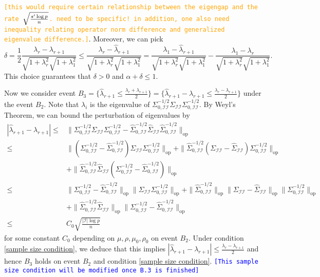 \documentclass[11pt]{article}
\newcommand{\nb}[1]{\textcolor{orange}{\texttt{[#1]}}}
\newcommand{\gsc}[1]{\textcolor{blue}{\texttt{[#1]}}}
\newcommand{\cI}{{\mathcal{I}}}
\newcommand{\0}{{\mathbf{0}}}
\newcommand{\op}{{\mathrm{op}}}
\begin{document}
 \nb{this would require certain relationship between the eigengap and the rate $\sqrt{s'\log p \over n}$. need to be specific! in addition, one also need inequality relating operator norm difference and generalized eigenvalue difference.}. 
Moreover, we can pick 
\begin{equation*}
\delta = \frac{1}{2}\frac{\lambda_r-\lambda_{r+1}}{\sqrt{1+\lambda_r^2}\sqrt{1+\lambda_1^2}}\leq\frac{\lambda_r-\widehat{\lambda}_{r+1}}{\sqrt{1+\lambda_r^2}\sqrt{1+\lambda_1^2}} = \frac{\lambda_1-\widehat{\lambda}_{r+1}}{\sqrt{1+\lambda_{r}^2}\sqrt{1+\lambda_1^2}}-\frac{\lambda_1-\lambda_r}{\sqrt{1+\lambda_r^2}\sqrt{1+\lambda_1^2}} .
\end{equation*}
This choice guarantees that $\delta>0$ and $\alpha+\delta\leq 1$. 
\par Now we consider event $B_3=\{\widehat{\lambda}_{r+1}\leq \frac{\lambda_r+\lambda_{r+1}}{2}\}=\{\widehat{\lambda}_{r+1}-\lambda_{r+1}\leq \frac{\lambda_r-\lambda_{r+1}}{2}\}$ under the event $B_2$. Note that $\lambda_i$ is the eigenvalue of $\Sigma_{0,\cI\cI}^{-1/2}\Sigma_{\cI\cI}\Sigma_{0,\cI\cI}^{-1/2}$. By Weyl's Theorem, we can bound the perturbation of eigenvalues by\begin{align*}
|\widehat{\lambda}_{r+1}-\lambda_{r+1}|
\leq& \|\Sigma_{0,\cI\cI}^{-1/2}\Sigma_{\cI\cI}\Sigma_{0,\cI\cI}^{-1/2}-\widehat{\Sigma}_{0,\cI\cI}^{-1/2}\widehat{\Sigma}_{\cI\cI}\widehat{\Sigma}_{0,\cI\cI}^{-1/2}\|_\op\\
\leq& \|(\Sigma_{0,\cI\cI}^{-1/2}-\widehat{\Sigma}_{0,\cI\cI}^{-1/2})\Sigma_{\cI\cI}\Sigma_{0,\cI\cI}^{-1/2}\|_\op+\|\widehat{\Sigma}_{0,\cI\cI}^{-1/2}(\Sigma_{\cI\cI}-\widehat{\Sigma}_{\cI\cI})\Sigma_{0,\cI\cI}^{-1/2}\|_\op\\
&+\|\widehat{\Sigma}_{0,\cI\cI}^{-1/2}\widehat{\Sigma}_{\cI\cI}(\Sigma_{0,\cI\cI}^{-1/2}-\widehat{\Sigma}_{0,\cI\cI}^{-1/2})\|_\op\\
\leq& \|\Sigma_{0,\cI\cI}^{-1/2}-\widehat{\Sigma}_{0,\cI\cI}^{-1/2}\|_\op\|\Sigma_{\cI\cI}\Sigma_{0,\cI\cI}^{-1/2}\|_\op+\|\widehat{\Sigma}_{0,\cI\cI}^{-1/2}\|_\op\|\Sigma_{\cI\cI}-\widehat{\Sigma}_{\cI\cI}\|_\op\|\Sigma_{0,\cI\cI}^{-1/2}\|_\op\\
&+\|\widehat{\Sigma}_{0,\cI\cI}^{-1/2}\widehat{\Sigma}_{\cI\cI}\|_\op\|\Sigma_{0,\cI\cI}^{-1/2}-\widehat{\Sigma}_{0,\cI\cI}^{-1/2}\|_\op\\
\leq & C_0\sqrt{\frac{|\cI|\log p}{n}}
\end{align*}
for some constant $C_0$ depending on $\mu,\rho,\mu_0,\rho_0$ on event $B_2$. Under condition \eqref{sample size condition}, we deduce that this implies $|\widehat{\lambda}_{r+1}-\lambda_{r+1}|\leq \frac{\lambda_r-\lambda_{r+1}}{2}$ and hence $B_3$ holds on event $B_2$ and condition \eqref{sample size condition}. \gsc{This sample size condition will be modified once B.3 is finished}
\end{document}
